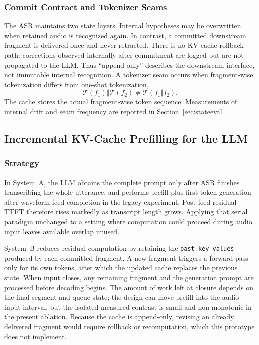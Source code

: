 \documentclass[conference]{IEEEtran}
\begin{document}
\subsubsection{Commit Contract and Tokenizer Seams}

The ASR maintains two state layers. Internal hypotheses may be overwritten when retained audio is recognized again. In contrast, a committed downstream fragment is delivered once and never retracted. There is no KV-cache rollback path: corrections observed internally after commitment are logged but are not propagated to the LLM. Thus ``append-only'' describes the downstream interface, not immutable internal recognition. A tokenizer seam occurs when fragment-wise tokenization differs from one-shot tokenization,
\begin{equation}
\mathcal{T}(f_1)\Vert\mathcal{T}(f_2)\neq\mathcal{T}(f_1\Vert f_2).
\label{eq:seam}
\end{equation}
The cache stores the actual fragment-wise token sequence. Measurements of internal drift and seam frequency are reported in Section~\ref{sec:stateeval}.

\subsection{Incremental KV-Cache Prefilling for the LLM}\label{sec:kv-prefill}

\subsubsection{Strategy}

In System~A, the LLM obtains the complete prompt only after ASR finishes transcribing the whole utterance, and performs prefill plus first-token generation after waveform feed completion in the legacy experiment. Post-feed residual TTFT therefore rises markedly as transcript length grows. Applying that serial paradigm unchanged to a setting where computation could proceed during audio input leaves available overlap unused.

System~B reduces residual computation by retaining the \texttt{past\_key\_values} produced by each committed fragment. A new fragment triggers a forward pass only for its own tokens, after which the updated cache replaces the previous state. When input closes, any remaining fragment and the generation prompt are processed before decoding begins. The amount of work left at closure depends on the final segment and queue state; the design can move prefill into the audio-input interval, but the isolated measured contrast is small and non-monotonic in the present ablation. Because the cache is append-only, revising an already delivered fragment would require rollback or recomputation, which this prototype does not implement.
\end{document}
